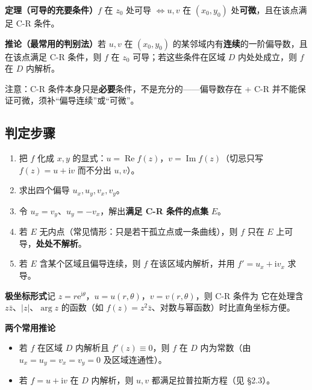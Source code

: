 \textbf{定理（可导的充要条件）}\quad \(f\) 在 \(z_{0}\) 处可导 \(\iff u,v\) 在 \((x_{0},y_{0})\) 处\textbf{可微}，且在该点满足 C-R 条件。

\textbf{推论（最常用的判别法）}\quad 若 \(u,v\) 在 \((x_{0},y_{0})\) 的某邻域内有\textbf{连续}的一阶偏导数，且在该点满足 C-R 条件，则 \(f\) 在 \(z_{0}\) 可导；若这些条件在区域 \(D\) 内处处成立，则 \(f\) 在 \(D\) 内解析。

注意：C-R 条件本身只是\textbf{必要}条件，不是充分的——偏导数存在 + C-R 并不能保证可微，须补“偏导连续”或“可微”。

\subsection*{判定步骤}
\begin{enumerate}[leftmargin=2em]
  \item 把 \(f\) 化成 \(x,y\) 的显式：\(u=\operatorname{Re}f(z)\)，\(v=\operatorname{Im}f(z)\)（切忌只写 \(f(z)=u+\mathrm{i}v\) 而不分出 \(u,v\)）。
  \item 求出四个偏导 \(u_{x},u_{y},v_{x},v_{y}\)。
  \item 令 \(u_{x}=v_{y}\)、\(u_{y}=-v_{x}\)，解出\textbf{满足 C-R 条件的点集} \(E\)。
  \item 若 \(E\) 无内点（常见情形：只是若干孤立点或一条曲线），则 \(f\) 只在 \(E\) 上可导，\textbf{处处不解析}。
  \item 若 \(E\) 含某个区域且偏导连续，则 \(f\) 在该区域内解析，并用 \(f'=u_{x}+\mathrm{i}v_{x}\) 求导。
\end{enumerate}

\textbf{极坐标形式}\quad 记 \(z=r\mathrm{e}^{\mathrm{i}\theta}\)，\(u=u(r,\theta)\)，\(v=v(r,\theta)\)，则 C-R 条件为
它在处理含 \(z\bar z\)、\(|z|\)、\(\arg z\) 的函数（如 \(f(z)=z^{2}\bar z\)、对数与幂函数）时比直角坐标方便。

\textbf{两个常用推论}
\begin{itemize}[leftmargin=2em]
  \item 若 \(f\) 在区域 \(D\) 内解析且 \(f'(z)\equiv 0\)，则 \(f\) 在 \(D\) 内为常数（由 \(u_{x}=u_{y}=v_{x}=v_{y}=0\) 及区域连通性）。
  \item 若 \(f=u+\mathrm{i}v\) 在 \(D\) 内解析，则 \(u,v\) 都满足拉普拉斯方程（见 §2.3）。
\end{itemize}

